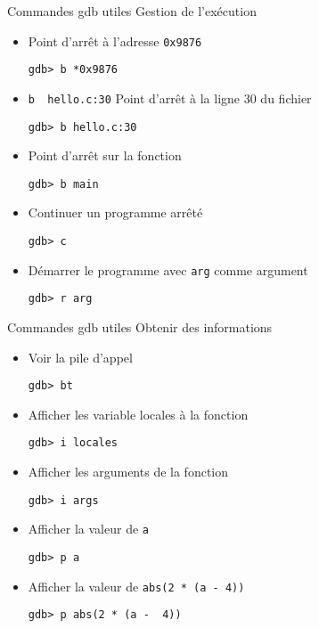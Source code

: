 \begin{frame}[fragile=singleslide]{Commandes gdb utiles}
  Gestion de l'exécution
  \begin{itemize}
  \item Point d'arrêt à l'adresse \verb+0x9876+
    \begin{lstlisting}
gdb> b *0x9876
    \end{lstlisting}
  \item \verb+b  hello.c:30+ Point  d'arrêt à la  ligne 30  du fichier
    \begin{lstlisting}
gdb> b hello.c:30
    \end{lstlisting}
  \item Point d'arrêt sur la fonction 
    \begin{lstlisting}
gdb> b main
    \end{lstlisting}
  \item Continuer un programme arrêté
    \begin{lstlisting}
gdb> c
    \end{lstlisting}
  \item Démarrer le programme avec \verb+arg+ comme argument
    \begin{lstlisting}
gdb> r arg
    \end{lstlisting}
  \end{itemize}
\end{frame}
  
\begin{frame}[fragile=singleslide]{Commandes gdb utiles}
  Obtenir des informations
  \begin{itemize}
  \item Voir la pile d'appel
    \begin{lstlisting}
gdb> bt
    \end{lstlisting}
  \item Afficher les variable locales à la fonction
    \begin{lstlisting}
gdb> i locales
    \end{lstlisting}
  \item Afficher les arguments de la fonction
    \begin{lstlisting}
gdb> i args
    \end{lstlisting}
  \item Afficher la valeur de \verb+a+
    \begin{lstlisting}
gdb> p a
    \end{lstlisting}
  \item Afficher la valeur de \verb+abs(2 * (a - 4))+
    \begin{lstlisting}
gdb> p abs(2 * (a -  4))
    \end{lstlisting}
  \end{itemize}
\end{frame}


